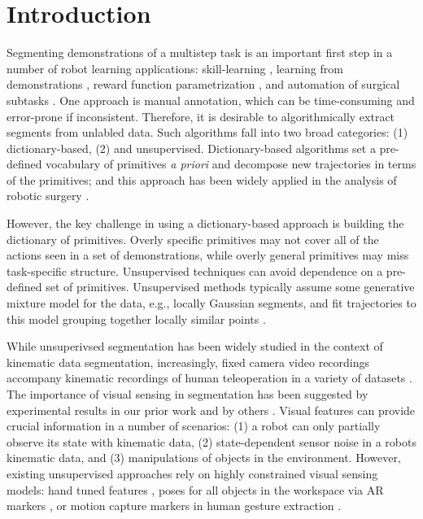 \section{Introduction}
Segmenting demonstrations of a multistep task is an important first step in a number of robot learning applications: skill-learning \cite{calinon2010learning, kruger2010learning, konidaris2011robot}, learning from demonstrations \cite{Niekum2015}, reward function parametrization \cite{hanlearning}, and automation of surgical subtasks \cite{murali2015learning}.
One approach is manual annotation, which can be time-consuming and error-prone if inconsistent.
Therefore, it is desirable to algorithmically extract segments from unlabled data.
Such algorithms fall into two broad categories: (1) dictionary-based, (2) and unsupervised.
Dictionary-based algorithms set a pre-defined vocabulary of primitives \emph{a priori} and decompose new trajectories in terms of the primitives; and this approach has been widely applied in the analysis of robotic surgery \cite{DBLP:dblp_conf/wacv/LeaHV15,zappella2013surgical}.

However, the key challenge in using a dictionary-based approach is building the dictionary of primitives. 
Overly specific primitives may not cover all of the actions seen in a set of demonstrations, while overly general primitives may miss task-specific structure.
Unsupervised techniques can avoid dependence on a pre-defined set of primitives.
Unsupervised methods typically assume some generative mixture model for the data, e.g., locally Gaussian segments, and fit trajectories to this model grouping together locally similar points \cite{calinon2010learning, krishnan2015tsc, calinon2004stochastic, kruger2010learning, fox2009nonparametric, oh2005learning}.

While unsuperivsed segmentation has been widely studied in the context of kinematic data segmentation, increasingly, fixed camera video recordings accompany kinematic recordings of human teleoperation in a variety of datasets \cite{hodgins2009guide, gao2014jigsaws, ofli2013berkeley}.
The importance of visual sensing in segmentation has been suggested by experimental results in our prior work \cite{krishnan2015tsc} and by others \cite{Niekum2015}.
Visual features can provide crucial information in a number of scenarios: (1) a robot can only partially observe its state with kinematic data, (2) state-dependent sensor noise in a robots kinematic data, and (3) manipulations of objects in the environment.
However, existing unsupervised approaches rely on highly constrained visual sensing models: hand tuned features \cite{krishnan2015tsc}, poses for all objects in the workspace via AR markers \cite{Niekum2015}, or motion capture markers in human gesture extraction \cite{kulic2011incremental}.

